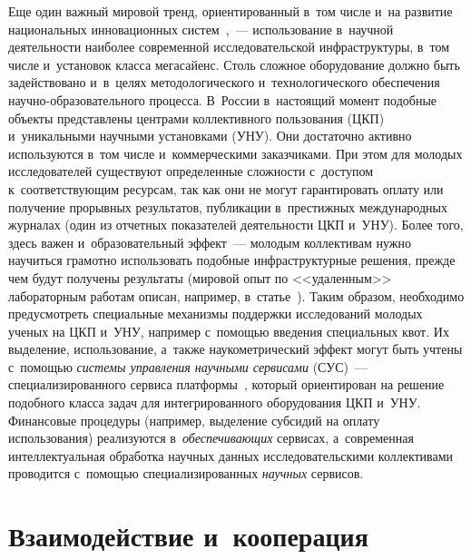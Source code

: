 \begin{multicols}{2}
Еще один важный мировой тренд, ориентированный в~том числе и~на развитие 
национальных\linebreak
 инновационных систем~\cite{Autio2004},~--- 
использование в~научной деятельности наиболее современной ис\-следовательской 
инфраструктуры, в~том числе и~установок класса мегасайенс. Столь сложное оборудование 
должно быть задействовано и~в~целях методологического и~технологического обеспечения 
научно-образовательного процесса. В~России в~настоящий момент подобные объекты 
представлены центрами коллективного пользования (ЦКП) и~уникальными научными 
установками (УНУ). Они достаточно активно используются в~том чис\-ле и~коммерческими 
заказчиками. При этом для молодых исследователей существуют определенные 
сложности с~доступом к~со\-от\-вет\-ст\-ву\-ющим ресурсам, так как они не могут 
гарантировать оплату или получение прорывных результатов, пуб\-ли\-ка\-ции в~престижных 
международных журналах (один из отчетных показателей деятельности ЦКП и~УНУ). 
Более того, здесь важен и~образовательный эффект~--- молодым коллективам нужно 
научиться грамотно использовать подобные инфраструктурные решения, прежде 
чем будут получены результаты (мировой опыт по <<удаленным>> лабораторным работам 
описан, например, в~статье~\cite{Rapuano2006}). Таким образом, необходимо 
предусмотреть специальные механизмы поддержки исследований молодых ученых на ЦКП и~УНУ, 
например с~помощью введения специальных квот. Их выделение, использование, а~также 
наукометрический эффект могут быть учтены с~помощью \textit{сис\-те\-мы управ\-ле\-ния 
научными сервисами} (СУС)~--- специализированного сервиса 
платформы~\cite{Gorshenin2017}, который ориентирован на решение подобного 
класса задач для интегрированного оборудования ЦКП и~УНУ. Финансовые процедуры 
(например, выделение субсидий на оплату использования) реализуются 
в~\textit{обеспечивающих} сервисах, а~современная интеллектуальная обработка 
научных данных исследовательскими коллективами проводится с~по\-мощью 
специализированных \textit{научных} сервисов.

\vspace*{-9pt}

\section{Взаимодействие и~кооперация}
\label{Interaction}


\end{multicols}
